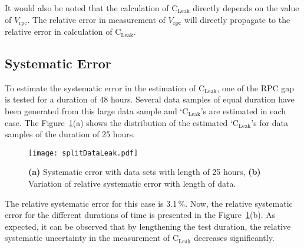 It would also be noted that the calculation of $\textrm{C}_{\textrm{Leak}}$ directly depends on the value of $V_{\textrm{rpc}}$. The relative error in measurement of $V_{\textrm{rpc}}$ will directly propagate to the relative error in calculation of $\textrm{C}_{\textrm{Leak}}$.

\subsection{Systematic Error}
To estimate the systematic error in the estimation of $\textrm{C}_{\textrm{Leak}}$, one of the RPC gap is tested for a duration of 48 hours. Several data samples of equal duration have been generated from this large data sample and `$\textrm{C}_{\textrm{Leak}}$'s are estimated in each case. The Figure~\ref{fig:systematic}(a) shows the distribution of the estimated `$\textrm{C}_{\textrm{Leak}}$'s for data samples of the duration of 25 hours.
\begin{figure}
  \centering
  \texttt{[image: splitDataLeak.pdf]}
  \caption{\textbf{(a)} Systematic error with data sets with length of 25 hours, \textbf{(b)} Variation of relative systematic error with length of data.}
  \label{fig:systematic}
\end{figure}
The relative systematic error for this case is 3.1\,\%. Now, the relative systematic error for the different durations of time is presented in the Figure~\ref{fig:systematic}(b). As expected, it can be observed that by lengthening the test duration, the relative systematic uncertainty in the measurement of $\textrm{C}_{\textrm{Leak}}$ decreases significantly.


